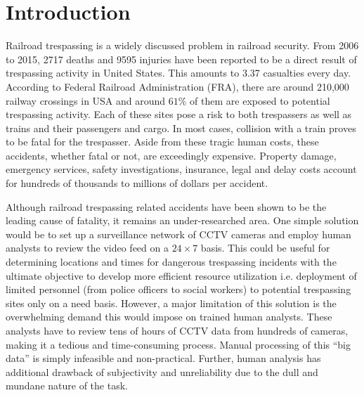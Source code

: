 \section{Introduction}
Railroad trespassing is a widely discussed problem in railroad security. From 2006 to 2015, 2717 deaths and 9595 injuries have been reported to be a direct result of trespassing activity in United States\cite{zhang2018automated}. This amounts to 3.37 casualties every day. According to Federal Railroad Administration (FRA), there are around 210,000 railway crossings in USA and around $61\%$ of them are exposed to potential trespassing activity\cite{zhang2018automated}. Each of these sites pose a risk to both trespassers as well as trains and their passengers and cargo. In most cases, collision with a train proves to be fatal for the trespasser. Aside from these tragic human costs, these accidents, whether fatal or not, are exceedingly expensive. Property damage, emergency services, safety investigations, insurance, legal and delay costs account for hundreds of thousands to millions of dollars per accident\cite{goldberg1998train}. 

Although railroad trespassing related accidents have been shown to be the leading cause of fatality\cite{pelletier1997deaths,matzopoulos1998hours,lobb2003evaluation,evans2003accidental}, it remains an under-researched area\cite{lobb2006trespassing}. One simple solution would be to set up a surveillance network of CCTV cameras and employ human analysts to review the video feed on a $24 \times 7$
basis. This could be useful for determining locations and times for dangerous trespassing incidents with the ultimate objective to develop  more efficient resource utilization i.e. deployment of limited personnel (from police officers to social workers) to potential trespassing sites only on a need basis. However, a major limitation of this solution is the overwhelming demand this would impose on trained human analysts. These analysts have to review tens of hours of CCTV data from hundreds of cameras, making it a tedious and time-consuming process. Manual processing of this ``big data'' is simply infeasible and non-practical. Further, human analysis has additional drawback of subjectivity and unreliability due to the dull and mundane nature of the task\cite{norouznezhad2008high}.

